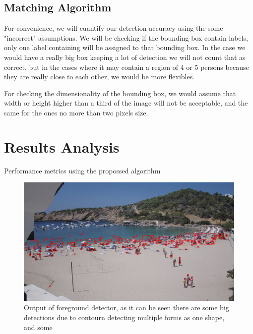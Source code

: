 \documentclass[11pt]{article}
\begin{document}
\subsection{Matching Algorithm}
For convenience, we will cuantify our detection accuracy using the some "incorrect" assumptions. We will be checking if the bounding box contain labels, only one label containing will be assigned to that bounding box. In the case we would have a really big box keeping a lot of detection we will not count that as correct, but in the cases where it may contain a region of 4 or 5 persons because they are really close to each other, we would be more flexibles.\newline

For checking the dimensionality of the bounding box, we would assume that width or height higher than a third of the image will not be acceptable, and the same for the ones no more than two pixels size. 
\section{Results Analysis}

\begin{table} [hp]
    \centering
    \caption[Performance metrics Basic]{Performance metrics using the propossed algorithm}\label{table:metrics}
\end{table}

\begin{figure}
    \centering
    \includegraphics[width=\textwidth]{img/det_name.jpg}
    \caption{Output of foreground detector, as it can be seen there are some big detections due to contourn detecting multiple forms as one shape, and some }
    \label{fig:detections}
\end{figure}
\end{document}
